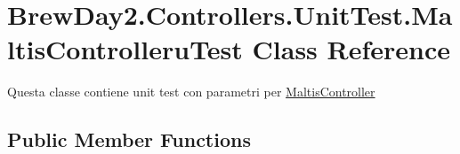 \hypertarget{class_brew_day2_1_1_controllers_1_1_unit_test_1_1_maltis_controlleru_test}{}\section{Brew\+Day2.\+Controllers.\+Unit\+Test.\+Maltis\+Controlleru\+Test Class Reference}
\label{class_brew_day2_1_1_controllers_1_1_unit_test_1_1_maltis_controlleru_test}


Questa classe contiene unit test con parametri per \mbox{\hyperlink{class_brew_day2_1_1_controllers_1_1_maltis_controller}{Maltis\+Controller}} 


\subsection*{Public Member Functions}
